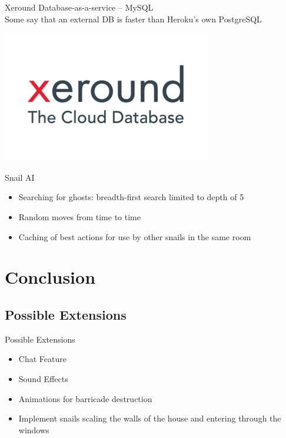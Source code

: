 \documentclass{beamer}
\begin{document}
\begin{frame}{Xeround}
  Database-as-a-service -- MySQL \\
  \vspace{\baselineskip}
  Some say that an external DB is faster than Heroku's own PostgreSQL
  \vspace{\baselineskip}
  \begin{center}
    \includegraphics[scale=0.25]{xeround.png} \\
  \end{center}
\end{frame}

\begin{frame}{Snail AI}
  \begin{itemize}
    \item Searching for ghosts: breadth-first search limited to depth of 5
    \vspace{\baselineskip}
    \item Random moves from time to time
    \vspace{\baselineskip}
    \item Caching of best actions for use by other snails in the same room
  \end{itemize}
\end{frame}


\section{Conclusion}
\subsection{Possible Extensions}

\begin{frame}{Possible Extensions}
  \begin{itemize}
    \item Chat Feature
    \vspace{\baselineskip}
    \item Sound Effects
    \vspace{\baselineskip}
    \item Animations for barricade destruction
    \vspace{\baselineskip}
    \item Implement snails scaling the walls of the house and entering through the windows
  \end{itemize}
\end{frame}
\end{document}
